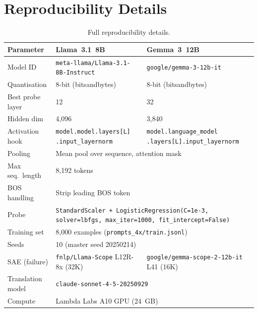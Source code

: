 \documentclass{article}
\newcommand{\llama}{Llama~3.1~8B\xspace}
\newcommand{\gemma}{Gemma~3~12B\xspace}
\begin{document}
\section{Reproducibility Details}
\label{app:repro}

\begin{table}[h]
\centering
\small
\caption{Full reproducibility details.}
\label{tab:repro}
\setlength{\tabcolsep}{4pt}
\begin{tabular}{p{3.2cm}p{4.8cm}p{4.8cm}}
\toprule
Parameter              & \llama & \gemma \\
\midrule
Model ID               & {\footnotesize\texttt{meta-llama/Llama-3.1-8B-Instruct}}
                       & {\footnotesize\texttt{google/gemma-3-12b-it}} \\[2pt]
Quantisation           & 8-bit (bitsandbytes) & 8-bit (bitsandbytes) \\
Best probe layer       & 12     & 32 \\
Hidden dim             & 4,096  & 3,840 \\
Activation hook        & {\footnotesize\texttt{model.model.layers[L] .input\_layernorm}}
                       & {\footnotesize\texttt{model.language\_model .layers[L].input\_layernorm}} \\[2pt]
Pooling                & \multicolumn{2}{l}{Mean pool over sequence, attention mask} \\
Max seq.\ length       & \multicolumn{2}{l}{8,192 tokens} \\
BOS handling           & \multicolumn{2}{l}{Strip leading BOS token} \\
Probe                  & \multicolumn{2}{p{9.6cm}}{%
                         {\footnotesize\texttt{StandardScaler + LogisticRegression(C=1e-3,
                         solver=lbfgs, max\_iter=1000, fit\_intercept=False)}}} \\[2pt]
Training set           & \multicolumn{2}{l}{8,000 examples (\texttt{prompts\_4x/train.jsonl})} \\
Seeds                  & \multicolumn{2}{l}{10 (master seed 20250214)} \\
SAE (failure)          & {\footnotesize\texttt{fnlp/Llama-Scope} L12R-8x (32K)}
                       & {\footnotesize\texttt{google/gemma-scope-2-12b-it} L41 (16K)} \\[2pt]
Translation model      & \multicolumn{2}{l}{\texttt{claude-sonnet-4-5-20250929}} \\
Compute                & \multicolumn{2}{l}{Lambda Labs A10 GPU (24~GB)} \\
\bottomrule
\end{tabular}
\end{table}
\end{document}
